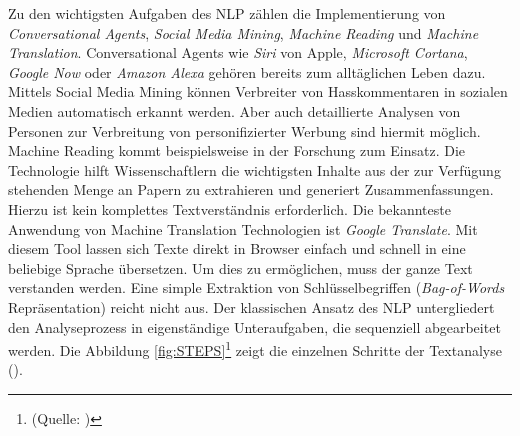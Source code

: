 Zu den wichtigsten Aufgaben des \ac{NLP} zählen die Implementierung von \textit{Conversational Agents}, \textit{Social Media Mining}, \textit{Machine Reading} und \textit{Machine Translation}. Conversational Agents wie \textit{Siri} von Apple, \textit{Microsoft Cortana}, \textit{Google Now} oder \textit{Amazon Alexa} gehören bereits zum alltäglichen Leben dazu. Mittels Social Media Mining können Verbreiter von Hasskommentaren in sozialen Medien automatisch erkannt werden. Aber auch detaillierte Analysen von Personen zur Verbreitung von personifizierter Werbung sind hiermit möglich. Machine Reading kommt beispielsweise in der Forschung zum Einsatz. Die Technologie hilft Wissenschaftlern die wichtigsten Inhalte aus der zur Verfügung stehenden Menge an Papern zu extrahieren und generiert Zusammenfassungen. Hierzu ist kein komplettes Textverständnis erforderlich. Die bekannteste Anwendung  von Machine Translation Technologien ist \textit{Google Translate}. Mit diesem Tool lassen sich Texte direkt in Browser einfach und schnell in eine beliebige Sprache übersetzen. Um dies zu ermöglichen, muss der ganze Text verstanden werden. Eine simple Extraktion von Schlüsselbegriffen (\textit{Bag-of-Words} Repräsentation) reicht nicht aus.
Der klassischen Ansatz des \ac{NLP} untergliedert den Analyseprozess in eigenständige Unteraufgaben, die sequenziell abgearbeitet werden. Die Abbildung \ref{fig:STEPS}\footnote{(Quelle: \cite[vgl.][4]{DALE})} zeigt die einzelnen Schritte der Textanalyse (\cite[vgl.][4]{DALE}). 
